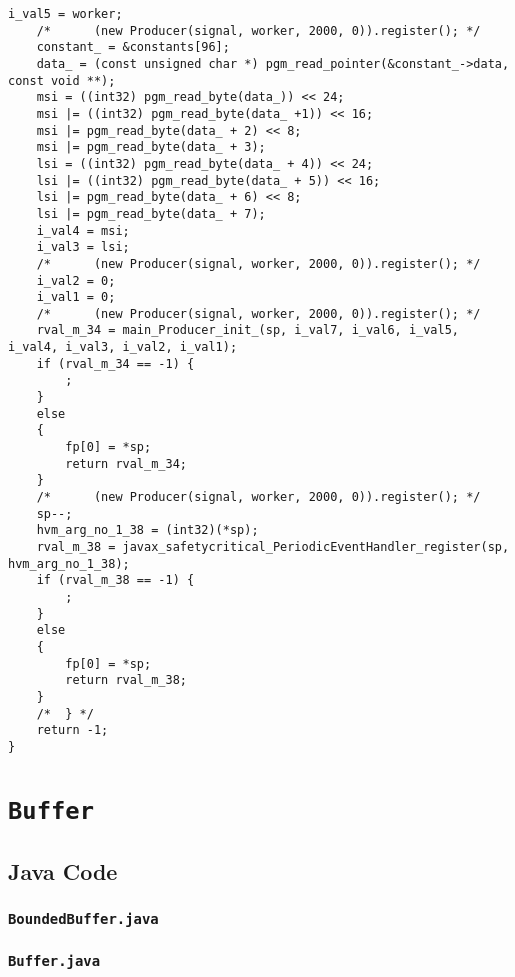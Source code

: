 \begin{landscape}
\begin{multicols}{2}
\begin{lstlisting}[firstnumber=53988]
	i_val5 = worker;
	/*		(new Producer(signal, worker, 2000, 0)).register(); */
	constant_ = &constants[96];
	data_ = (const unsigned char *) pgm_read_pointer(&constant_->data, const void **);
	msi = ((int32) pgm_read_byte(data_)) << 24;
	msi |= ((int32) pgm_read_byte(data_ +1)) << 16;
	msi |= pgm_read_byte(data_ + 2) << 8;
	msi |= pgm_read_byte(data_ + 3);
	lsi = ((int32) pgm_read_byte(data_ + 4)) << 24;
	lsi |= ((int32) pgm_read_byte(data_ + 5)) << 16;
	lsi |= pgm_read_byte(data_ + 6) << 8;
	lsi |= pgm_read_byte(data_ + 7);
	i_val4 = msi;
	i_val3 = lsi;
	/*		(new Producer(signal, worker, 2000, 0)).register(); */
	i_val2 = 0;
	i_val1 = 0;
	/*		(new Producer(signal, worker, 2000, 0)).register(); */
	rval_m_34 = main_Producer_init_(sp, i_val7, i_val6, i_val5, i_val4, i_val3, i_val2, i_val1);
	if (rval_m_34 == -1) {
		;
	}
	else
	{
		fp[0] = *sp;
		return rval_m_34;
	}
	/*		(new Producer(signal, worker, 2000, 0)).register(); */
	sp--;
	hvm_arg_no_1_38 = (int32)(*sp);
	rval_m_38 = javax_safetycritical_PeriodicEventHandler_register(sp, hvm_arg_no_1_38);
	if (rval_m_38 == -1) {
		;
	}
	else
	{
		fp[0] = *sp;
		return rval_m_38;
	}
	/*	} */
	return -1;
}
\end{lstlisting}


\section{\texorpdfstring{\texttt{Buffer}}{Buffer}}
\label{Buffer-code-section}

\subsection{Java Code}
\label{Buffer-java-code-subsection}

\subsubsection{\texttt{BoundedBuffer.java}}


\subsubsection{\texttt{Buffer.java}}



\end{multicols}
\end{landscape}
